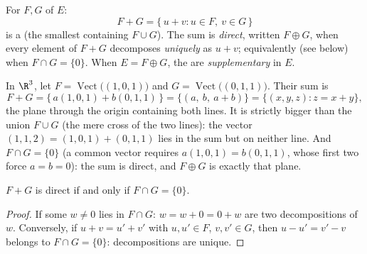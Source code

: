 \begin{definition}\label{def:b1:vspaces:sum}
For  $F, G$ of $E$:
\[
F + G = \{\,u + v : u \in F,\ v \in G\,\}
\]
is a  (the smallest containing $F \cup G$). The sum is
\emph{direct}, written $F \oplus G$, when every
element of $F + G$ decomposes \emph{uniquely} as $u + v$;
equivalently (see below) when $F \cap G = \{0\}$. When $E = F \oplus
G$, the  are \emph{supplementary} in $E$.
\end{definition}

\begin{example}
\label{ex:b1:vspaces:sumoflines}
In $\R^3$, let $F = \operatorname{Vect}\bigl((1,0,1)\bigr)$ and
$G = \operatorname{Vect}\bigl((0,1,1)\bigr)$. Their sum is
\[
F + G = \{\,a(1,0,1) + b(0,1,1)\,\}
= \{(a,\ b,\ a + b)\} = \{(x, y, z) : z = x + y\},
\]
the plane through the origin containing both lines. It is
strictly bigger than the union $F \cup G$ (the mere cross of the
two lines): the vector $(1, 1, 2) = (1,0,1) + (0,1,1)$ lies in
the sum but on neither line. And $F \cap G = \{0\}$ (a common
vector requires $a(1,0,1) = b(0,1,1)$, whose first two
 force $a = b = 0$): the sum is direct, and $F \oplus
G$ is exactly that plane.
\end{example}

\begin{proposition}\label{prop:b1:vspaces:directsum}
$F + G$ is direct if and only if $F \cap G = \{0\}$.
\end{proposition}

\begin{proof}
If some $w \neq 0$ lies in $F \cap G$: $w = w + 0 = 0 + w$ are two
decompositions of $w$. Conversely, if $u + v = u' + v'$ with $u, u'
\in F$, $v, v' \in G$, then $u - u' = v' - v$ belongs to $F \cap G =
\{0\}$: decompositions are unique.
\end{proof}

